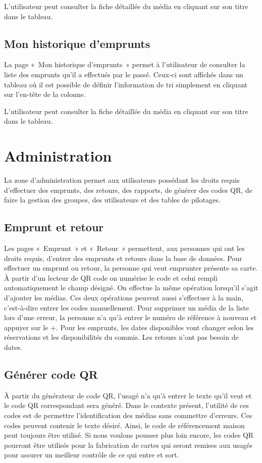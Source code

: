\documentclass[letter, 11pt]{report}
\begin{document}
L'utilisateur peut consulter la fiche détaillée du média en cliquant sur son titre dans le tableau.

\subsection{Mon historique d'emprunts}

La page «~Mon historique d'emprunts~» permet à l'utilisateur de consulter la liste des emprunts qu'il a effectués par le passé. Ceux-ci sont affichés dans un tableau où il est possible de définir l'information de tri simplement en cliquant sur l'en-tête de la colonne.

L'utilisateur peut consulter la fiche détaillée du média en cliquant sur son titre dans le tableau.

\section{Administration}
La zone d'administration permet aux utilisateurs possédant les droits requis d'effectuer des emprunts, des retours, des rapports, de générer des codes QR, de faire la gestion des groupes, des utilisateurs et des tables de pilotages.

\subsection{Emprunt et retour}
Les pages «~Emprunt~» et «~Retour~» permettent, aux personnes qui ont les droits requis, d'entrer des emprunts et retours dans la base de données. Pour effectuer un emprunt ou retour, la personne qui veut emprunter présente sa carte. À partir d'un lecteur de QR code on numérise le code et celui rempli automatiquement le champ désigné. On effectue la même opération lorsqu'il s'agit d'ajouter les médias. Ces deux opérations peuvent aussi s'effectuer à la main, c'est-à-dire entrer les codes manuellement. Pour supprimer un média de la liste lors d'une erreur, la personne n'a qu'à entrer le numéro de référence à nouveau et appuyer sur le +. Pour les emprunts, les dates disponibles vont changer selon les réservations et les disponibilités du commis. Les retours n'ont pas besoin de dates.

\subsection{Générer code QR}
À partir du générateur de code QR, l'usagé n'a qu'à entrer le texte qu'il veut et le code QR correspondant sera généré. Dans le contexte présent, l'utilité de ces codes est de permettre l'identification des médias sans commettre d'erreurs. Ces codes peuvent contenir le texte désiré. Ainsi, le code de référencement maison peut toujours être utilisé. Si nous voulons pousser plus loin encore, les codes QR pourront être utilisés pour la fabrication de cartes qui seront remises aux usagés pour assurer un meilleur contrôle de ce qui entre et sort.
\end{document}
